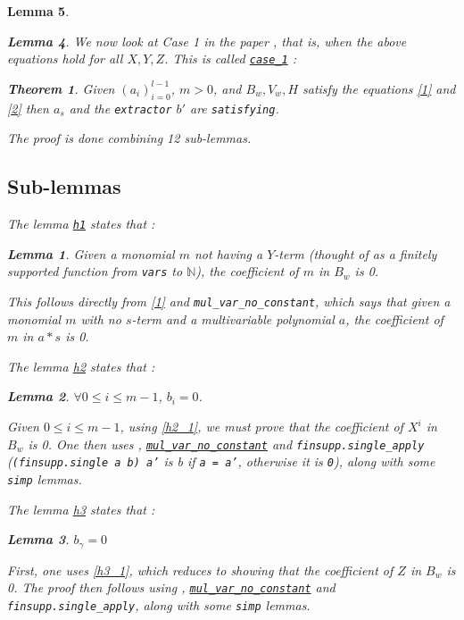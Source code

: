 \documentclass{article}
\newtheorem{lemma}{Lemma}
\newtheorem{theorem}{Theorem}
\theoremstyle{definition}
\theoremstyle{remark}
\begin{document}
\begin{lemma}
\begin{lemma}
We now look at Case 1 in the paper \cite{main}, that is, when the above equations hold for all $X, Y, Z$. This is called 
\href{https://github.com/BoltonBailey/formal-snarks-project/blob/7fd9cd122f5887f88f6a706b4f2a68a7153c7381/src/snarks/babysnark/knowledge_soundness.lean#L351}{\texttt{case\_1}} : 
\theoremstyle{theorem}
\begin{theorem}
  Given $(a_i)_{i = 0}^{l - 1}$, $m > 0$, and $B_w, V_w, H$ satisfy the equations \eqref{1} and \eqref{2} then $a_s$ and the \texttt{extractor} $b'$ are \texttt{satisfying}.
\end{theorem}

The proof is done combining 12 sub-lemmas.

\subsection{Sub-lemmas}
The lemma \href{https://github.com/BoltonBailey/formal-snarks-project/blob/7fd9cd122f5887f88f6a706b4f2a68a7153c7381/src/snarks/babysnark/knowledge_soundness.lean#L362}{\texttt{h1}} states that :
\theoremstyle{lemma}
\begin{lemma}
  Given a monomial $m$ not having a $Y$-term (thought of as a finitely supported function from \texttt{vars} to $\mathbb{N}$), the coefficient of $m$ in $B_w$ is 0.
\end{lemma}
This follows directly from \eqref{1} and \texttt{mul\_var\_no\_constant}, which says that given a monomial $m$ with no $s$-term and a multivariable polynomial $a$, the coefficient of $m$ in $a * s$ is 0.

The lemma \href{https://github.com/BoltonBailey/formal-snarks-project/blob/7fd9cd122f5887f88f6a706b4f2a68a7153c7381/src/snarks/babysnark/knowledge_soundness.lean#L366}{h2} states that :
\theoremstyle{lemma}
\begin{lemma} \label{h2}
  $\forall 0 \le i \le m - 1$, $b_i = 0$.
\end{lemma}
Given $0 \le i \le m - 1$, using \ref{h2_1}, we must prove that the coefficient of $X^i$ in $B_w$ is 0. One then uses , 
\href{https://github.com/BoltonBailey/formal-snarks-project/blob/7fd9cd122f5887f88f6a706b4f2a68a7153c7381/src/general_lemmas/mv_divisability.lean#L193}{\texttt{mul\_var\_no\_constant}} and 
\texttt{finsupp.single\_apply} (\texttt{(finsupp.single a b) a'} is b if \texttt{a = a'}, otherwise it is \texttt{0}), along with some \texttt{simp} lemmas.

The lemma \href{https://github.com/BoltonBailey/formal-snarks-project/blob/7fd9cd122f5887f88f6a706b4f2a68a7153c7381/src/snarks/babysnark/knowledge_soundness.lean#L366}{h3} states that :
\theoremstyle{lemma}
\begin{lemma} \label{h3}
  $b_{\gamma} = 0$
\end{lemma}
First, one uses \ref{h3_1}, which reduces to showing that the coefficient of $Z$ in $B_w$ is 0. The proof then follows using , \href{https://github.com/BoltonBailey/formal-snarks-project/blob/7fd9cd122f5887f88f6a706b4f2a68a7153c7381/src/general_lemmas/mv_divisability.lean#L193}{\texttt{mul\_var\_no\_constant}} and 
\texttt{finsupp.single\_apply}, along with some \texttt{simp} lemmas.


\end{lemma}
\end{lemma}
\end{document}
